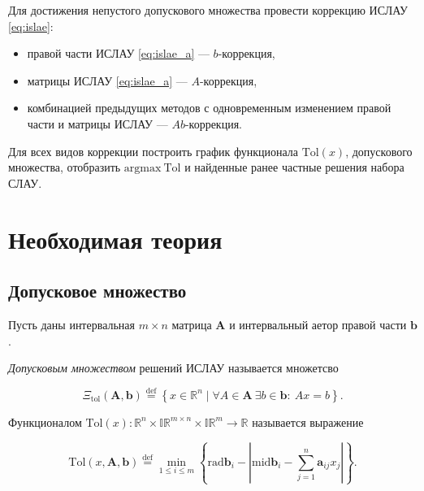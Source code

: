 \documentclass{article}
\begin{document}
  Для достижения непустого допускового множества провести коррекцию ИСЛАУ
  \ref{eq:islae}:

  \begin{itemize}
    \item правой части ИСЛАУ \ref{eq:islae_a} --- \( b \)-коррекция,
    \item матрицы ИСЛАУ \ref{eq:islae_a} --- \( A \)-коррекция,
    \item комбинацией предыдущих методов с одновременным изменением
      правой части и матрицы ИСЛАУ — \( Ab \)-коррекция.
  \end{itemize}

  Для всех видов коррекции построить график функционала
  \( \text{Tol} (x) \), допускового множества, отобразить
  \( \text{argmax} \ \text{Tol} \) и найденные ранее частные решения набора
  СЛАУ.

  \section{Необходимая теория}

  \subsection{Допусковое множество}

  Пусть даны интервальная \( m \times n \) матрица \( \mathbf{A} \) и
  интервальный аетор правой части \( \mathbf{b} \).

  \vspace{\baselineskip}

  \emph{Допусковым множеством} решений ИСЛАУ называется множетсво

  \begin{equation} \label{eq:tol_set_of_solutions}
    \Xi_{\text{tol}} (\mathbf{A}, \mathbf{b}) \stackrel{\text{def}}{=}
      \left \{ x \in \mathbb{R}^n \mid \forall A \in \mathbf{A} \ \exists b \in \mathbf{b}: \ Ax = b \right \}.
  \end{equation}

  \vspace{\baselineskip}

  Функционалом \( \text{Tol} (x): \mathbb{R}^n \times \mathbb{IR}^{m \times n} \times \mathbb{IR}^m \to \mathbb{R} \)
  называется выражение

  \begin{equation} \label{eq:tol}
    \text{Tol} (x, \mathbf{A}, \mathbf{b}) \stackrel{\text{def}}{=}
      \min_{1 \leq i \leq m} \left \{ \text{rad} \mathbf{b}_i - \left | \text{mid} \mathbf{b}_i - \sum_{j=1}^n \mathbf{a}_{ij} x_j \right | \right \}.
  \end{equation}
\end{document}
